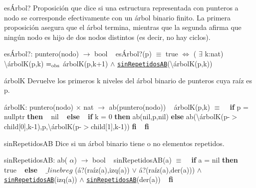 \begin{DoxyParagraph}{esÁrbol?}
Proposición que dice si una estructura representada con punteros a nodo se corresponde efectivamente con un árbol binario finito. La primera proposición asegura que el árbol termina, mientras que la segunda afirma que ningún nodo es hijo de dos nodos distintos (es decir, no hay ciclos).

esÁrbol?\+: puntero(nodo) $\to$ bool ~\newline
esÁrbol?(p) $\equiv$ true $\Leftrightarrow$ ( $\exists$ k\+:nat) \textbackslash{}árbol\+K(p,k) $=_{\rm obs}$ árbolK(p,k+1) $\land$ \href{axiomas.html#sinRepetidosAB}{\tt sin\+Repetidos\+AB}(\textbackslash{}árbol\+K(p,k))


\end{DoxyParagraph}
\begin{DoxyParagraph}{árbolK}
Devuelve los primeros k niveles del árbol binario de punteros cuya raíz es p.

árbolK\+: puntero(nodo) $\times$ nat $\to$ ab(puntero(nodo)) ~\newline
árbol\+K(p,k) $\equiv$ ~\newline
 {\bfseries if} p = nullptr {\bfseries then} ~\newline
 nil ~\newline
 {\bfseries else} ~\newline
{\bfseries if} k = 0 {\bfseries then} ab(nil,p,nil) {\bfseries else} ab(\textbackslash{}árbolK(p-\/$>$child\mbox{[}0\mbox{]},k-\/1),p,\textbackslash{}árbolK(p-\/$>$child\mbox{[}1\mbox{]},k-\/1)) {\bfseries fi} ~\newline
 {\bfseries fi} 


\end{DoxyParagraph}
\begin{DoxyParagraph}{sin\+Repetidos\+AB}
Dice si un árbol binario tiene o no elementos repetidos.

sin\+Repetidos\+AB\+: ab( $\alpha$) $\to$ bool ~\newline
sin\+Repetidos\+A\+B(a) $\equiv$ ~\newline
{\bfseries if} a = nil {\bfseries then} ~\newline
true ~\newline
{\bfseries else} ~\newline
 $\_linebr eg$ (á?(raíz(a),izq(a)) $\lor$ á?(raíz(a),der(a))) $\land$ \href{axiomas.html#sinRepetidosAB}{\tt sin\+Repetidos\+AB}(izq(a)) $\land$ \href{axiomas.html#sinRepetidosAB}{\tt sin\+Repetidos\+AB}(der(a)) ~\newline
 {\bfseries fi} 


\end{DoxyParagraph}
